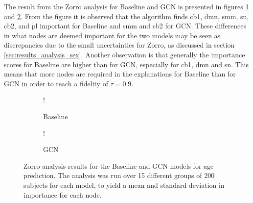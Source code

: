 The result from the Zorro analysis for Baseline and GCN is presented in figures \ref{fig:zorro_age_baseline} and \ref{fig:zorro_age_gcn}. From the figure it is observed that the algorithm finds \acrshort{cb1}, \acrshort{dmn}, \acrshort{smm}, \acrshort{sn}, \acrshort{cb2}, and \acrshort{pl} important for Baseline and \acrshort{smm} and \acrshort{cb2} for GCN. These differences in what nodes are deemed important for the two models may be seen as discrepancies due to the small uncertainties for Zorro, as discussed in section \ref{sec:results_analysis_sex}. Another observation is that generally the importance scores for Baseline are higher than for GCN, especially for \acrshort{cb1}, \acrshort{dmn} and \acrshort{sn}. This means that more nodes are required in the explanations for Baseline than for GCN in order to reach a fidelity of $\tau=0.9$.

\begin{figure}[!htbp]
    \centering
        \begin{subfigure}{.5\textwidth}
            \centering
            \begin{center}
                \resizebox {1.0\linewidth} {!} {
                    
                }
            \end{center}
            \caption{Baseline}
            \label{fig:zorro_age_baseline}
        \end{subfigure}%
        \begin{subfigure}{.5\textwidth}
            \centering
            \begin{center}
                \resizebox {1.0\linewidth} {!} {
                    
                }
            \end{center}
            \caption{GCN}
            \label{fig:zorro_age_gcn}
        \end{subfigure}
    \caption{Zorro analysis results for the Baseline and GCN models for age prediction. The analysis was run over 15 different groups of 200 subjects for each model, to yield a mean and standard deviation in importance for each node.}
    \label{fig:zorro_age}
\end{figure}

